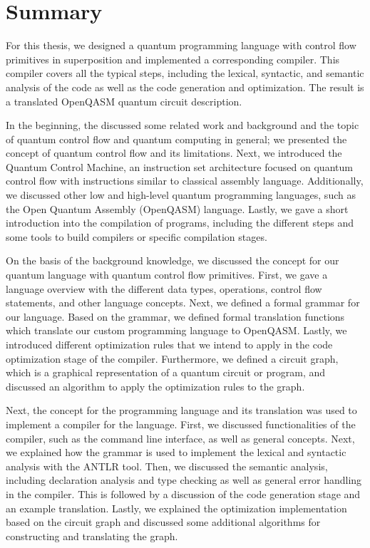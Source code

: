 \section{Summary}
For this thesis, we designed a quantum programming language with control flow primitives in superposition and implemented a corresponding compiler. This compiler covers all the typical steps, including the lexical, syntactic, and semantic analysis of the code as well as the code generation and optimization. The result is a translated OpenQASM quantum circuit description.

In the beginning, the discussed some related work and background and the topic of quantum control flow and quantum computing in general; we presented the concept of quantum control flow and its limitations. Next, we introduced the Quantum Control Machine, an instruction set architecture focused on quantum control flow with instructions similar to classical assembly language. Additionally, we discussed other low and high-level quantum programming languages, such as the Open Quantum Assembly (OpenQASM) language. Lastly, we gave a short introduction into the compilation of programs, including the different steps and some tools to build compilers or specific compilation stages.

On the basis of the background knowledge, we discussed the concept for our quantum language with quantum control flow primitives. First, we gave a language overview with the different data types, operations, control flow statements, and other language concepts. Next, we defined a formal grammar for our language. Based on the grammar, we defined formal translation functions which translate our custom programming language to OpenQASM. Lastly, we introduced different optimization rules that we intend to apply in the code optimization stage of the compiler. Furthermore, we defined a circuit graph, which is a graphical representation of a quantum circuit or program, and discussed an algorithm to apply the optimization rules to the graph.

Next, the concept for the programming language and its translation was used to implement a compiler for the language. First, we discussed functionalities of the compiler, such as the command line interface, as well as general concepts. Next, we explained how the grammar is used to implement the lexical and syntactic analysis with the ANTLR tool. Then, we discussed the semantic analysis, including declaration analysis and type checking as well as general error handling in the compiler. This is followed by a discussion of the code generation stage and an example translation. Lastly, we explained the optimization implementation based on the circuit graph and discussed some additional algorithms for constructing and translating the graph. 

